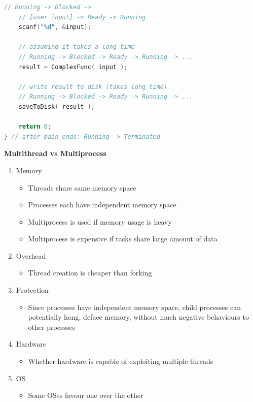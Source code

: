 \documentclass[a4paper, 12pt]{article}
\begin{document}
\begin{multicols*}{3}
\begin{lstlisting}[language=C]
    // Running -> Blocked -> 
    // [user input] -> Ready -> Running
    scanf("%d", &input);
    
    // assuming it takes a long time
    // Running -> Blocked -> Ready -> Running -> ...
    result = ComplexFunc( input );
    
    // write result to disk (takes long time)
    // Running -> Blocked -> Ready -> Running -> ...
    saveToDisk( result );
    
    return 0;
} // after main ends: Running -> Terminated
\end{lstlisting}

\medskip

\textbf{Multithread vs Multiprocess}
\begin{enumerate}
    \item Memory
    \begin{itemize}
        \item Threads share same memory space
        \item Processes each have independent memory space
        \item Multiprocess is used if memory usage is heavy
        \item Multiprocess is expensive if tasks share large amount of data
    \end{itemize}
    \item Overhead
    \begin{itemize}
        \item Thread creation is cheaper than forking
    \end{itemize}
    \item Protection
    \begin{itemize}
        \item Since processes have independent memory space, child processes can potentially hang, deface memory, without much negative behaviours to other processes
    \end{itemize}
    \item Hardware
    \begin{itemize}
        \item Whether hardware is capable of exploiting multiple threads
    \end{itemize}
    \item OS
    \begin{itemize}
        \item Some OSes favour one over the other
    \end{itemize}
\end{enumerate}


\end{multicols*}
\end{document}
